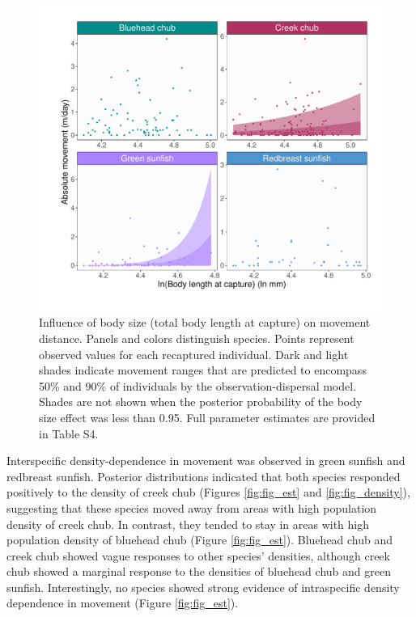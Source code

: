 \documentclass[11pt, class=article, crop=false]{standalone}
\begin{document}
\begin{figure}
    \centering
    \includegraphics[width=0.75\linewidth]{output/fig_size.pdf}
    \caption{Influence of body size (total body length at capture) on movement distance. Panels and colors distinguish species. Points represent observed values for each recaptured individual. Dark and light shades indicate movement ranges that are predicted to encompass 50\% and 90\% of individuals by the observation-dispersal model. Shades are not shown when the posterior probability of the body size effect was less than 0.95. Full parameter estimates are provided in Table S4.}
    \label{fig:fig_size}
\end{figure}

Interspecific density-dependence in movement was observed in green sunfish and redbreast sunfish. Posterior distributions indicated that both species responded positively to the density of creek chub (Figures \ref{fig:fig_est} and \ref{fig:fig_density}), suggesting that these species moved away from areas with high population density of creek chub. 
In contrast, they tended to stay in areas with high population density of bluehead chub (Figure \ref{fig:fig_est}).
Bluehead chub and creek chub showed vague responses to other species' densities, although creek chub showed a marginal response to the densities of bluehead chub and green sunfish.
Interestingly, no species showed strong evidence of intraspecific density dependence in movement (Figure \ref{fig:fig_est}).
\end{document}
